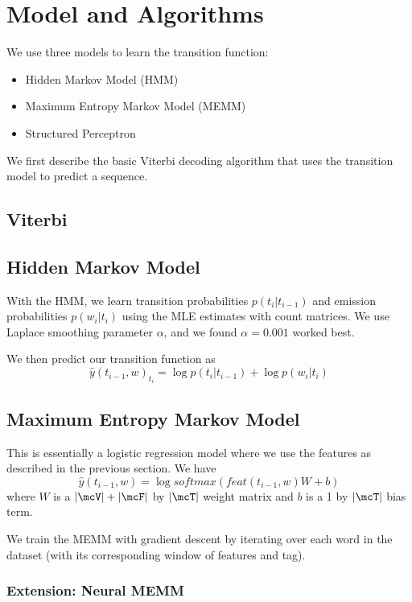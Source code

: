 \documentclass[11pt]{article}
\begin{document}
\section{Model and Algorithms}

We use three models to learn the transition function:
\begin{itemize}
  \item Hidden Markov Model (HMM)
  \item Maximum Entropy Markov Model (MEMM)
  \item Structured Perceptron
\end{itemize}

We first describe the basic Viterbi decoding algorithm that uses the transition model to predict a sequence.

\subsection{Viterbi}



\subsection{Hidden Markov Model}

With the HMM, we learn transition probabilities $p(t_i | t_{i-1})$ and emission probabilities $p(w_i | t_i)$ using the MLE estimates with count matrices. We use Laplace smoothing parameter $\alpha$, and we found $\alpha = 0.001$ worked best.

We then predict our transition function as
$$\widehat{y}(t_{i-1}, w)_{t_i} = \log p(t_i | t_{i-1}) + \log p(w_i | t_i)$$

\subsection{Maximum Entropy Markov Model}

This is essentially a logistic regression model where we use the features as described in the previous section. We have
$$\widehat{y}(t_{i-1}, w) = \log softmax(feat(t_{i-1}, w)W + b)$$
where $W$ is a $|\mcV| + |\mcF|$ by $|\mcT|$ weight matrix and $b$ is a 1 by $|\mcT|$ bias term.

We train the MEMM with gradient descent by iterating over each word in the dataset (with its corresponding window of features and tag).

\subsubsection{Extension: Neural MEMM}
\end{document}
